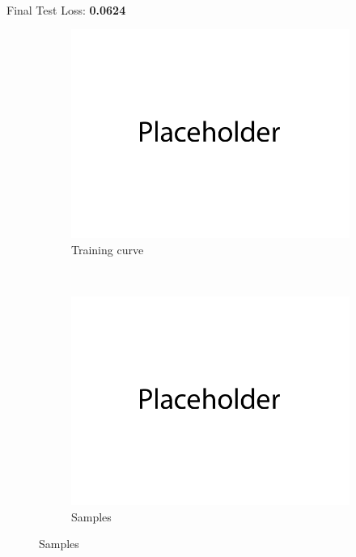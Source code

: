 \documentclass{article}
\begin{document}
\newpage
{} \\


Final Test Loss: \textbf{0.0624} \\
\begin{figure}[H]
    \centering
    \begin{subfigure}{0.7\textwidth}
        \centering
        \includegraphics[width=\textwidth]{figures/q2_train_plot.png}
        \caption{Training curve}
    \end{subfigure}
    \\
    \begin{subfigure}{0.7\textwidth}
        \centering
        \includegraphics[width=\textwidth]{figures/q2_samples.png}
        \caption{Samples}
    \end{subfigure}

\end{figure}
\end{document}
